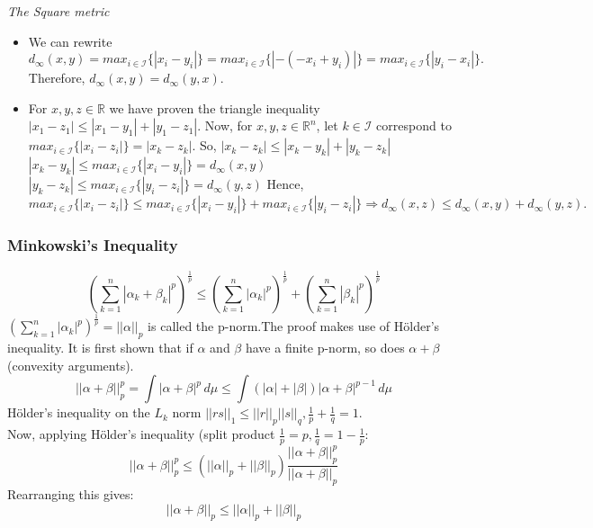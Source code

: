\begin{frame}
\textit{The Square metric}\hfill\break
\begin{itemize}
    \item We can rewrite $d_{\infty}(x,y) = max_{i\in \mathcal{I}}\{|x_i -
    y_i|\} = max_{i\in \mathcal{I}}\{|- (- x_i + y_i)|\} = max_{i\in \mathcal{I}}\{|y_i - x_i|\}.$
    Therefore, $d_{\infty}(x,y) = d_{\infty}(y,x).$ \hfill\break
    \pause
    \item For $x,y,z \in \mathbb{R}$ we have proven the triangle inequality $|x_1 - z_1| \leq |x_1 - y_1| + |y_1 - z_1|$.  \hfill\break
    \hfill\break
     Now, for $x,y,z \in \mathbb{R}^n$, let $k \in \mathcal{I}$ correspond to $max_{i\in \mathcal{I}}\{|x_i - z_i|\} = |x_k - z_k|.$ \hfill\break
     So, $|x_k - z_k| \leq |x_k - y_k| + |y_k - z_k|$
     \hfill\break
     \hfill\break
    $ |x_k - y_k| \leq max_{i\in \mathcal{I}}\{|x_i - y_i|\} = d_{\infty}(x,y)$
     \\
     $ |y_k - z_k| \leq max_{i\in \mathcal{I}}\{|y_i - z_i|\} = d_{\infty}(y,z)$
     \hfill\break
     \hfill\break
     Hence, $ max_{i\in \mathcal{I}}\{|x_i -
    z_i|\} \leq max_{i\in \mathcal{I}}\{|x_i - y_i|\} + max_{i\in \mathcal{I}}\{|y_i - z_i|\} \Rightarrow d_\infty(x,z) \leq d_\infty(x,y)+d_\infty(y,z).$
\end{itemize}
\end{frame}

\begin{frame}
\frametitle{Minkowski's Inequality}
\begin{equation*}
    (\sum_{k=1}^{n}|\alpha_k+\beta_k|^p)^\frac{1}{p} \leq (\sum_{k=1}^{n}|\alpha_k|^p)^\frac{1}{p} + (\sum_{k=1}^{n}|\beta_k|^p)^\frac{1}{p}
\end{equation*}
$(\sum_{k=1}^{n}|\alpha_k|^p)^\frac{1}{p} = ||\alpha||_p$ is called the
p-norm.The proof makes use of H\"older's inequality. It is first shown that if
$\alpha$ and $\beta$ have a finite p-norm, so does $\alpha+\beta$ (convexity
arguments).
\begin{equation*}
    ||\alpha+\beta||_p^p = \int |\alpha+\beta|^p \,d\mu \leq \int (|\alpha|+|\beta|)|\alpha+\beta|^{p-1} \,d\mu
\end{equation*}
H\"older's inequality on the $L_k$ norm $||rs||_1 \leq ||r||_p||s||_q, \frac{1}{p} + \frac{1}{q} = 1$. \\
Now, applying H\"older's inequality (split product $\frac{1}{p} = p, \frac{1}{q} = 1-\frac{1}{p}$:
\begin{equation*}
||\alpha+\beta||_p^p \leq  (||\alpha||_p+||\beta||_p)\frac{||\alpha+\beta||_p^p}{||\alpha+\beta||_p}
\end{equation*}
Rearranging this gives:
\begin{equation*}
||\alpha+\beta||_p \leq  ||\alpha||_p+||\beta||_p
\end{equation*}
\end{frame}


